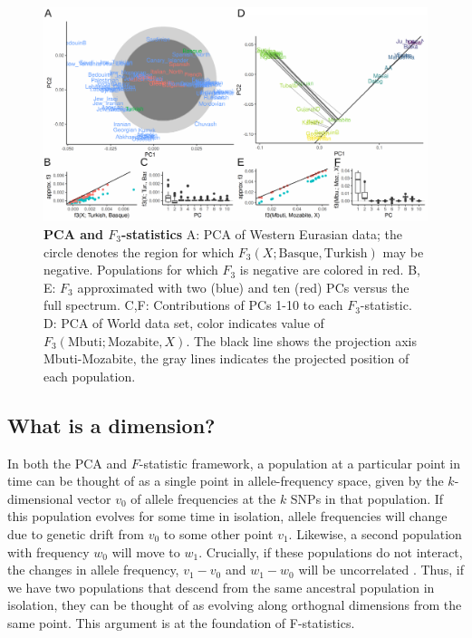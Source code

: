 \documentclass[12pt,a4pape, fullpage]{article}
\begin{document}
\begin{figure}[!ht]
	\includegraphics[width=\textwidth]{figures/fig_f3_data.pdf}
	\caption{\textbf{PCA and $F_3$-statistics} A: PCA of Western Eurasian data; the circle denotes the region for which $F_3(X; \text{Basque}, \text{Turkish})$ may be negative. Populations for which $F_3$ is negative are colored in red. B, E: $F_3$ approximated with two (blue) and ten (red) PCs versus the full spectrum. C,F: Contributions of PCs 1-10 to each $F_3$-statistic. D: PCA of World data set, color indicates value of $F_3(\text{Mbuti}; \text{Mozabite}, X)$. The black line shows the projection axis Mbuti-Mozabite, the gray lines indicates the projected position of each population. }
	\label{fig:f3}
\end{figure}


	\subsection{What is a dimension?}
	In both the PCA and $F$-statistic framework, a population at  a particular point in time can be thought of as a single point in allele-frequency space, given by the $k$-dimensional vector $v_0$ of allele frequencies at the $k$ SNPs in that population. If this population evolves for some time in isolation, allele frequencies will change due to genetic drift from $v_0$ to some other point $v_1$. Likewise, a second population with frequency $w_0$ will move to $w_1$. Crucially, if these populations do not interact, the changes in allele frequency, $v_1 - v_0$ and $w_1 - w_0$ will be uncorrelated \cite{patterson2012}. Thus, if we have two populations that descend from the same ancestral population in isolation, they can be thought of as evolving along orthognal dimensions from the same point. This argument is at the foundation of F-statistics.
	
\end{document}
